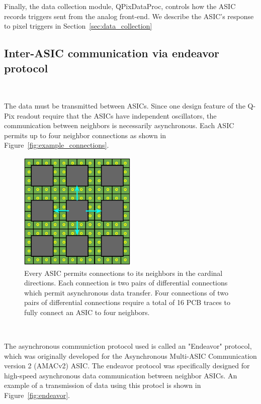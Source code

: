 Finally, the data collection module, QPixDataProc, controls how the ASIC records triggers sent from the analog front-end.
We describe the ASIC's response to pixel triggers in Section~\ref{sec:data_collection}


\subsection{Inter-ASIC communication via endeavor protocol}~\label{sec:endeavor}

The data must be transmitted between ASICs.
Since one design feature of the Q-Pix readout require that the ASICs have independent oscillators, the communication between neighbors is necessarily asynchronous.
Each ASIC permits up to four neighbor connections as shown in Figure~\ref{fig:example_connections}.


\begin{figure}[]
\centering
\includegraphics[width=0.5\textwidth]{images/asic_neighbor_connections_qpix.png}
\caption{Every ASIC permits connections to its neighbors in the cardinal directions.
Each connection is two pairs of differential connections which permit asynchronous data transfer.
Four connections of two pairs of differential connections require a total of 16 PCB traces to fully connect an ASIC to four neighbors.
}
\end{figure}~\label{fig:example_connections}

The asynchronous communiction protocol used is called an "Endeavor" protocol, which was originally developed for the Asynchronous Multi-ASIC Communication version 2 (AMACv2) ASIC.
The endeavor protocol was specifically designed for high-speed asynchronous data communication between neighbor ASICs.
An example of a transmission of data using this protocl is shown in Figure~\ref{fig:endeavor}.

